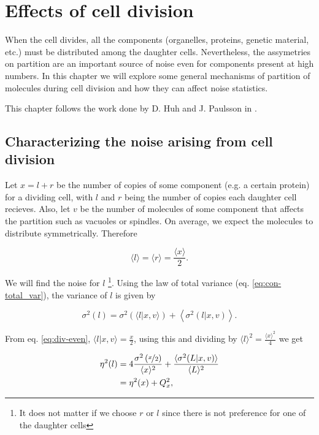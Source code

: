 \chapter{Effects of cell division}
\label{ch:div}

When the cell divides, all the components (organelles, proteins, genetic material, etc.) must be distributed among the daughter cells. Nevertheless, the assymetries on partition are an important source of noise even for components present at high numbers. In this chapter we will explore some general mechanisms of partition of molecules during cell division and how they can affect noise statistics.

This chapter follows the work done by D. Huh and J. Paulsson in \cite{huh11b}.

\section{Characterizing the noise arising from cell division}

Let $x = l+r$ be the number of copies of some component (e.g. a certain protein) for a dividing cell, with $l$ and $r$ being the number of copies each daughter cell recieves. Also, let $v$ be the number of molecules of some component that affects the partition such as vacuoles or spindles. On average, we expect the molecules to distribute symmetrically. Therefore

\begin{equation}
  \label{eq:div-even}
  \langle l\rangle = \langle r\rangle = \frac{\langle x\rangle}{2}.
\end{equation}

We will find the noise for $l$ \footnote{It does not matter if we choose $r$ or $l$ since there is not preference for one of the daughter cells}. Using the law of total variance (eq. \eqref{eq:con-total_var}), the variance of $l$ is given by

\begin{equation*}
  \sigma^2(l) = \sigma^2\left(\langle l|x,v\rangle\right) + \left\langle\sigma^2(l|x,v)\right\rangle.
\end{equation*}

From eq. \eqref{eq:div-even}, $\langle l|x,v\rangle = \frac{x}{2}$, using this and dividing by $\langle l\rangle^2 = \frac{\langle x\rangle^2}{4}$ we get

\begin{equation}
  \label{eq:div-noises}
  \begin{split}
    \eta^2(l) &= 4\frac{\sigma^2\left(\nicefrac{x}{2}\right)}{\langle x\rangle^2}+\frac{\langle\sigma^2(L|x,v)\rangle}{\langle L\rangle^2}\\
    &=\eta^2(x) + Q_x^2,
  \end{split}
\end{equation}

